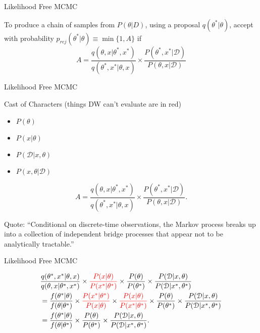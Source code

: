 \documentclass[12pt,a4paper,t,xcolor=dvipsnames,slidestop,compress,mathserif]{beamer}
\newcommand{\red}[1]{{\color{red}#1}}
\begin{document}
\begin{frame}{Likelihood Free MCMC}

To produce a chain of samples from $P(\theta|D)$, using a proposal $q(\theta^*|\theta)$, accept with probability $p_{rej}(\theta^*|\theta)\equiv\min \{1, A\}$ if $$A=\frac{q(\theta,x|\theta^*,x^*)}{q(\theta^*,x^*|\theta,x)} \times \frac{P(\theta^*,x^*|\mathcal{D})}{P(\theta,x|\mathcal{D})}
$$

\end{frame}
\begin{frame}{Likelihood Free MCMC}

Cast of Characters (\red{things DW can't evaluate are in red})
\begin{itemize}
\item ${P(\theta)}$
\item \red{${P(x|\theta)}$}
\item ${P(\mathcal{D}|x, \theta)}$
\item \red{${P(x, \theta|\mathcal{D})}$} 
\end{itemize}

$$A=\frac{q(\theta,x|\theta^*,x^*)}{q(\theta^*,x^*|\theta,x)} \times \frac{P(\theta^*,x^*|\mathcal{D})}{P(\theta,x|\mathcal{D})}.$$ 

Quote: ``Conditional on discrete-time observations, the Markov process breaks up into a collection of independent bridge processes that appear not to be analytically tractable.''

\end{frame}

\begin{frame}{Likelihood Free MCMC}

\begin{align*}
&\frac{q(\theta^*, x^*|\theta, x)}{q(\theta, x|\theta^*, x^*)}
\times 
\red{\frac{P(x| \theta)}{P(x^*| \theta^*)}}
\times 
\frac{ P( \theta)}{ P( \theta^*)}
\times 
\frac{P(\mathcal{D}|x, \theta)}{P(\mathcal{D}|x^*, \theta^*)}\\
&=\frac{f(\theta^*|\theta)}{f(\theta|\theta^*)}
\times 
\red{\frac{P(x^*| \theta^*)}{P(x| \theta)} }
\times 
\red{\frac{P(x| \theta)}{P(x^*| \theta^*)} }
\times 
\frac{ P( \theta)}{ P( \theta^*)}
\times 
\frac{P(\mathcal{D}|x, \theta)}{P(\mathcal{D}|x^*, \theta^*)}\\
&=\frac{f(\theta^*|\theta)}{f(\theta|\theta^*)}
\times 
\frac{ P( \theta)}{ P( \theta^*)}
\times 
\frac{P(\mathcal{D}|x, \theta)}{P(\mathcal{D}|x^*, \theta^*)}.
\end{align*}

\end{frame}
\end{document}
